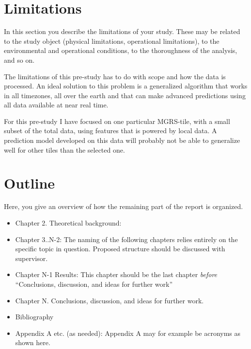 \section{Limitations}
\label{sec:limitations}
\begin{info}
	In this section you describe the limitations of your study. These may be related to the study object (physical limitations, operational limitations), to the environmental and operational conditions, to the thoroughness of the analysis, and so on.
\end{info}
The limitations of this pre-study has to do with scope and how the data is processed. An ideal solution to this problem is a generalized algorithm that works in all timezones, all over the earth and that can make advanced predictions using all data available at near real time. 

For this pre-study I have focused on one \cite{Tofting2018} particular MGRS-tile, with a small subset of the total data, using features that is powered by local data. A prediction model developed on this data will probably not be able to generalize well for other tiles than the selected one. 

\section{Outline}
\label{sec:outline}
\begin{info}
	Here, you give an overview of how the remaining part of the report is organized.
\end{info}

\begin{itemize}
	\item Chapter 2. Theoretical background: 
	\item Chapter 3..N-2: The naming of the following chapters relies entirely on the specific topic in question. Proposed structure should be discussed with supervisor.
	\item Chapter N-1 Results: This chapter should be the last chapter \textit{before} ``Conclusions, discussion, and ideas for further work''
	\item Chapter N. Conclusions, discussion, and ideas for further work.
	\item Bibliography
	\item Appendix A etc. (as needed): Appendix A may for example be acronyms as shown here.
\end{itemize}

